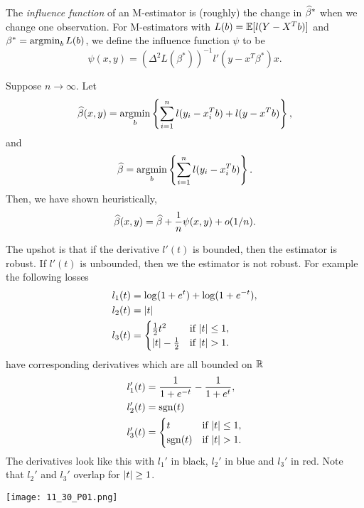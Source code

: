 \begin{defn}
    The \emph{influence function} of an M-estimator is (roughly) the change in $\widehat{\beta}^*$ when we change one observation. For M-estimators with $L(b)={\mathbb{E}}[l(Y-X^Tb)]$ and $\beta^* =\operatorname*{argmin}_b L(b)$, we define the influence function $\psi$ to be
    \[\psi(x,y)=(\Delta^2 L(\beta^*))^{-1}l'(y-x^T\beta^*)x. \]
\end{defn}
\begin{thrm}
    Suppose $n \to \infty$. Let 
    \[\widehat{\beta}(x,y)=\operatorname*{argmin}_b\left\{\sum_{i=1}^n l(y_i-x_i^Tb)+l(y-x^Tb)\right\},\]
    and
    \[\widehat{\beta}=\operatorname*{argmin}_b\left\{\sum_{i=1}^n l(y_i-x_i^Tb)\right\}.\]
    Then, we have shown heuristically,
    \[\widehat{\beta}(x,y)=\widehat{\beta}+\frac{1}{n}\psi(x,y)+o(1/n).\]
\end{thrm}
The upshot is that if the derivative $l'(t)$ is bounded, then the estimator is robust. If $l'(t)$ is unbounded, then we the estimator is not robust. For example the following losses
\begin{align*}
    l_1(t)&=\log(1+e^t)+\log(1+e^{-t}),\\
    l_2(t)&={\left\lvert t\right\rvert}\\
    l_3(t)&=\begin{cases}
        \frac{1}{2}t^2 & \text{if } {\left\lvert t\right\rvert}\le1,\\
        {\left\lvert t\right\rvert}-\frac{1}{2} & \text{if } {\left\lvert t\right\rvert}>1.
    \end{cases}
\end{align*}
have corresponding derivatives which are all bounded on ${\mathbb R}$
\begin{align*}
    l_1'(t)&=\frac{1}{1+e^{-t}}-\frac{1}{1+e^t},\\
    l_2'(t)&=\operatorname{sgn}(t)\\
    l_3'(t)&=\begin{cases}
        t & \text{if } {\left\lvert t\right\rvert}\le1,\\
        \operatorname{sgn}(t) & \text{if } {\left\lvert t\right\rvert}>1.
    \end{cases}
\end{align*}
The derivatives look like this with $l_1'$ in black, $l_2'$ in blue and $l_3'$ in red. Note that $l_2'$ and $l_3'$ overlap for ${\left\lvert t\right\rvert} \ge 1$.
\begin{center}
    \texttt{[image: 11\_30\_P01.png]}
\end{center}

